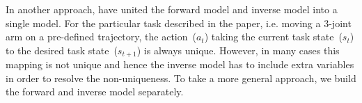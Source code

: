 

In another approach, \citet{petkos2006learning} have united the
forward model and inverse model into
a single model. For the particular task described in the paper, i.e. moving a 3-joint arm on a pre-defined trajectory,
the action~($a_t$) taking the current task state~($s_t$) to the
desired task state~($s_{t+1}$) is always unique. However, in many
cases this mapping is not unique and hence the inverse model has to
include extra variables in order to resolve the non-uniqueness. To
take a more general approach, we build the forward and inverse model
separately. %

